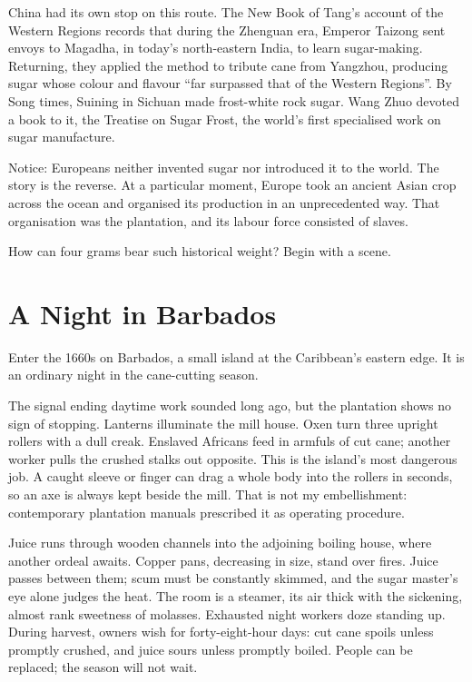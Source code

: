 China had its own stop on this route. The New Book of Tang's account of the Western Regions records that during the Zhenguan era, Emperor Taizong sent envoys to Magadha, in today's north-eastern India, to learn sugar-making. Returning, they applied the method to tribute cane from Yangzhou, producing sugar whose colour and flavour ``far surpassed that of the Western Regions''. By Song times, Suining in Sichuan made frost-white rock sugar. Wang Zhuo devoted a book to it, the Treatise on Sugar Frost, the world's first specialised work on sugar manufacture.

Notice: Europeans neither invented sugar nor introduced it to the world. The story is the reverse. At a particular moment, Europe took an ancient Asian crop across the ocean and organised its production in an unprecedented way. That organisation was the plantation, and its labour force consisted of slaves.

How can four grams bear such historical weight? Begin with a scene.

\section{A Night in Barbados}
Enter the 1660s on Barbados, a small island at the Caribbean's eastern edge. It is an ordinary night in the cane-cutting season.

The signal ending daytime work sounded long ago, but the plantation shows no sign of stopping. Lanterns illuminate the mill house. Oxen turn three upright rollers with a dull creak. Enslaved Africans feed in armfuls of cut cane; another worker pulls the crushed stalks out opposite. This is the island's most dangerous job. A caught sleeve or finger can drag a whole body into the rollers in seconds, so an axe is always kept beside the mill. That is not my embellishment: contemporary plantation manuals prescribed it as operating procedure.

Juice runs through wooden channels into the adjoining boiling house, where another ordeal awaits. Copper pans, decreasing in size, stand over fires. Juice passes between them; scum must be constantly skimmed, and the sugar master's eye alone judges the heat. The room is a steamer, its air thick with the sickening, almost rank sweetness of molasses. Exhausted night workers doze standing up. During harvest, owners wish for forty-eight-hour days: cut cane spoils unless promptly crushed, and juice sours unless promptly boiled. People can be replaced; the season will not wait.

